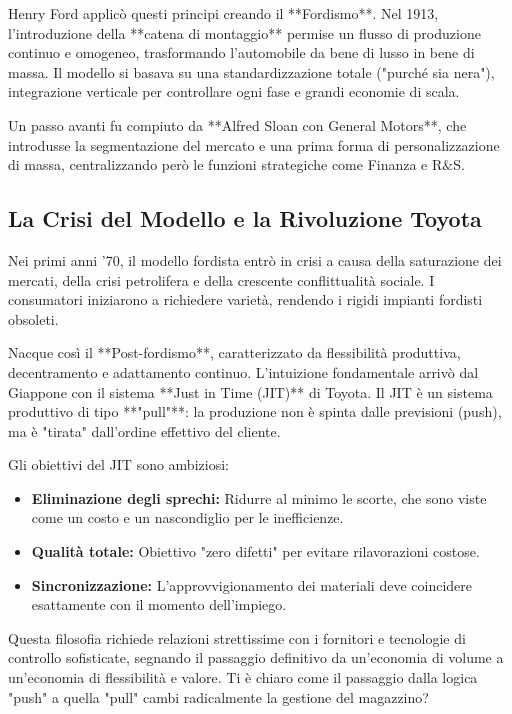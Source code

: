 \documentclass[a4paper,10pt]{article}
\begin{document}
Henry Ford applicò questi principi creando il **Fordismo**. Nel 1913, l'introduzione della **catena di montaggio** permise un flusso di produzione continuo e omogeneo, trasformando l'automobile da bene di lusso in bene di massa. Il modello si basava su una standardizzazione totale ("purché sia nera"), integrazione verticale per controllare ogni fase e grandi economie di scala.

Un passo avanti fu compiuto da **Alfred Sloan con General Motors**, che introdusse la segmentazione del mercato e una prima forma di personalizzazione di massa, centralizzando però le funzioni strategiche come Finanza e R$\&$S.

\subsection*{La Crisi del Modello e la Rivoluzione Toyota}

Nei primi anni '70, il modello fordista entrò in crisi a causa della saturazione dei mercati, della crisi petrolifera e della crescente conflittualità sociale. I consumatori iniziarono a richiedere varietà, rendendo i rigidi impianti fordisti obsoleti.

Nacque così il **Post-fordismo**, caratterizzato da flessibilità produttiva, decentramento e adattamento continuo. L'intuizione fondamentale arrivò dal Giappone con il sistema **Just in Time (JIT)** di Toyota. 
Il JIT è un sistema produttivo di tipo **"pull"**: la produzione non è spinta dalle previsioni (push), ma è "tirata" dall'ordine effettivo del cliente. 

Gli obiettivi del JIT sono ambiziosi:
\begin{itemize}
    \item \textbf{Eliminazione degli sprechi:} Ridurre al minimo le scorte, che sono viste come un costo e un nascondiglio per le inefficienze.
    \item \textbf{Qualità totale:} Obiettivo "zero difetti" per evitare rilavorazioni costose.
    \item \textbf{Sincronizzazione:} L'approvvigionamento dei materiali deve coincidere esattamente con il momento dell'impiego.
\end{itemize}

Questa filosofia richiede relazioni strettissime con i fornitori e tecnologie di controllo sofisticate, segnando il passaggio definitivo da un'economia di volume a un'economia di flessibilità e valore. Ti è chiaro come il passaggio dalla logica "push" a quella "pull" cambi radicalmente la gestione del magazzino?
\end{document}
